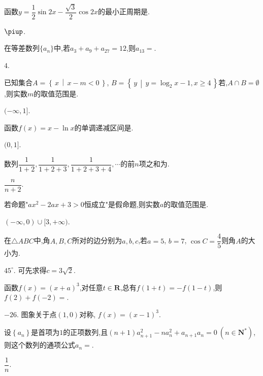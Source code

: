 \documentclass[addpoints,no-math,twoside]{exam} %
\newcommand\set[1]{\left\{ #1 \right\}} %
\newcommand\Set[2]{\left\{\, #1 \, \middle\vert \, #2 \,\right\}} %
\begin{document}
\begin{questions}
\question
函数$y=\dfrac{1}{2}\sin2x-\dfrac{\sqrt{3}}{2}\cos2x$的最小正周期是\underline{\hspace{6em}}.
\begin{solution}
$\piup$.
\end{solution}

\question
在等差数列$\{a_n\}$中,若$a_3+a_9+a_{27}=12$,则$a_{13}=$\underline{\hspace{6em}}.
\begin{solution}
$4$.
\end{solution}

\question
已知集合$A=\Set{x}{x-m<0}$, $B=\Set{y}{y=\log_2x-1, x\geq 4}$若,$A\cap B=\emptyset$,则实数$m$的取值范围是\underline{\hspace{6em}}.
\begin{solution}
$(-\infty,1]$.
\end{solution}

\question
函数$f(x)=x-\ln x$的单调递减区间是\underline{\hspace{6em}}.
\begin{solution}
$(0,1]$.
\end{solution}

\question
数列$\dfrac{1}{1+2}, \dfrac{1}{1+2+3}, \dfrac{1}{1+2+3+4}, \cdots$的前$n$项之和为\underline{\hspace{6em}}.
\begin{solution}
$\dfrac{n}{n+2}$.
\end{solution}

\question
若命题"$ax^2-2ax+3>0$恒成立"是假命题,则实数$a$的取值范围是\underline{\hspace{6em}}.
\begin{solution}
$(-\infty,0)\cup[3,+\infty)$.
\end{solution}

\question
在$\triangle{ABC}$中,角$A,B,C$所对的边分别为$a,b,c$,若$a=5$, $b=7$, $\cos C=\dfrac{4}{5}$则角$A$的大小为\underline{\hspace{6em}}.
\begin{solution}
$45^\circ $. \quad 可先求得$c=3\sqrt{2}$.
\end{solution}

\question
函数$f(x)=(x+a)^3$,对任意$t\in\mathbf{R}$,总有$f(1+t)=-f(1-t)$,则$f(2)+f(-2)=$\underline{\hspace{6em}}.
\begin{solution}
$-26$. \quad 图象关于点$(1,0)$对称, $f(x)=(x-1)^3$.
\end{solution}

\question
设$\set{a_n}$是首项为$1$的正项数列,且$(n+1)a_{n+1}^2-na_n^2+a_{n+1}a_n=0\ (n\in\mathbf{N^{\ast}})$,则这个数列的通项公式$a_n=$\underline{\hspace{6em}}.
\begin{solution}
$\dfrac{1}{n}$.
\end{solution}


\end{questions}
\end{document}
